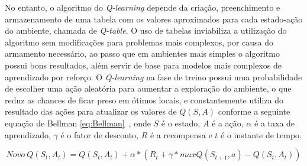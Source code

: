 No entanto, o algoritmo do \emph{Q-learning} depende da criação, preenchimento e armazenamento de uma tabela com os valores aproximados para cada estado-ação do ambiente, chamada de \emph{Q-table}. O uso de tabelas inviabiliza a utilização do algoritmo sem modificações para problemas mais complexos, por causa do armamento necessário, ao passo que em ambientes mais simples o algoritmo possui bons resultados, além servir de base para modelos mais complexos de aprendizado por reforço. O \emph{Q-learning} na fase de treino possui uma probabilidade de escolher uma ação aleatória para aumentar a exploração do ambiente, o que reduz as chances de ficar preso em ótimos locais, e constantemente utiliza do resultado das ações para atualizar os valores de $Q(S, A)$ conforme a seguinte equação de Bellman \ref{eq:Bellman}~\citep{Bellman_1954}, onde $S$ é o estado, $A$ é a ação, $\alpha$ é a taxa de aprendizado, $\gamma$ é o fator de desconto, $R$ é a recompensa e $t$ é o instante de tempo.

\begin{equation}
	\label{eq:Bellman}
	Novo \ Q(S_{t}, A_{t}) = Q(S_{t}, A_{t}) + \alpha * (R_{t} + \gamma * maxQ(S_{t+1}, a) - Q(S_{t}, A_{t}))
\end{equation}
